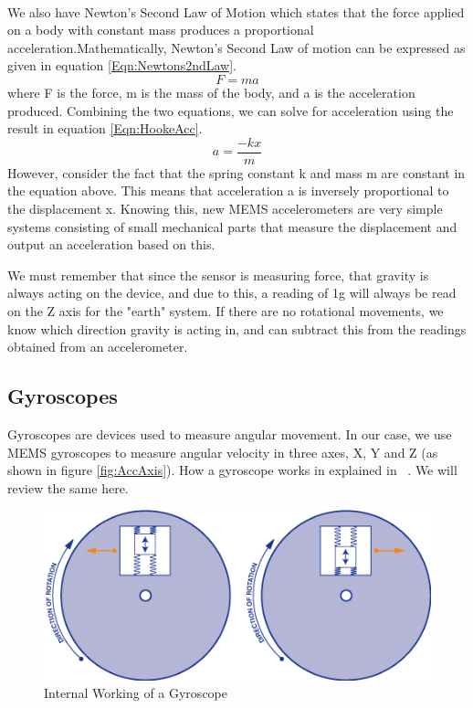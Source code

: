 \hfill \\
We also have Newton's Second Law of Motion which states that the force applied on a body with constant mass produces a proportional acceleration.Mathematically, Newton's Second Law of motion can be expressed as given in equation \ref{Eqn:Newtons2ndLaw}.
\begin{equation}
\label{Eqn:Newtons2ndLaw}
F = ma 
\end{equation}
where F is the force, m is the mass of the body, and a is the acceleration produced. Combining the two equations, we can solve for acceleration using the result in equation \ref{Eqn:HookeAcc}.
\begin{equation}
\label{Eqn:HookeAcc}
a = \frac{-kx}{m} 
\end{equation}
However, consider the fact that the spring constant k and mass m are constant in the equation above. This means that acceleration a is inversely proportional to the displacement x. Knowing this, new MEMS accelerometers are very simple systems consisting of small mechanical parts that measure the displacement and output an acceleration based on this.
\hfill

We must remember that since the sensor is measuring force, that gravity is always acting on the device, and due to this, a reading of 1g will always be read on the Z axis for the "earth" system. If there are no rotational movements, we know which direction gravity is acting in, and can subtract this from the readings obtained from an accelerometer.

\subsection{Gyroscopes}
\label{Sec:Gyroscope}

Gyroscopes are devices used to measure angular movement. In our case, we use MEMS gyroscopes to measure angular velocity in three axes, X, Y and Z (as shown in figure \ref{fig:AccAxis}). How a gyroscope works in explained in ~\cite{Web:SparkfunGyros}. We will review the same here.
\begin{figure}
\begin{center}
\includegraphics{images/GyroWork.png}
\caption{Internal Working of a Gyroscope}
\label{fig:GyroDiag}
\end{center}
\end{figure}

